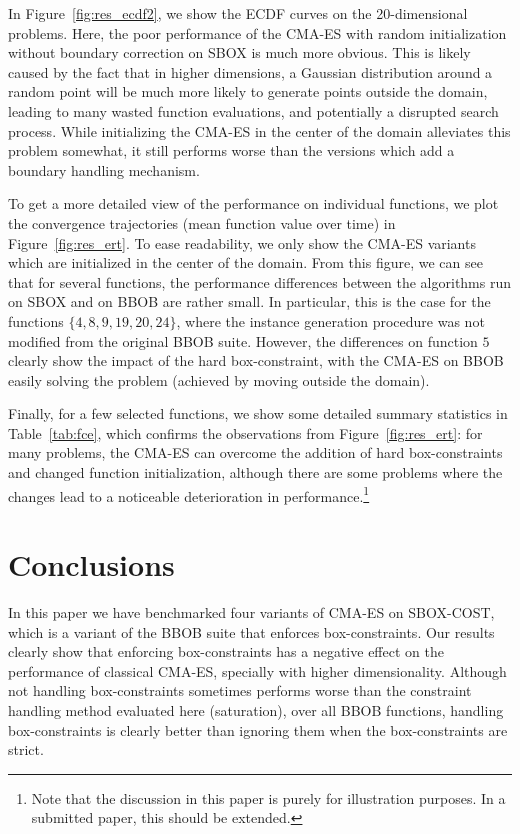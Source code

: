 \documentclass[sigconf=true, nonacm=false, review=true, anonymous = false,screen=true]{acmart}
\begin{document}
In Figure~\ref{fig:res_ecdf2}, we show the ECDF curves on the 20-dimensional problems. Here, the poor performance of the CMA-ES with random initialization without boundary correction on SBOX is much more obvious. This is likely caused by the fact that in higher dimensions, a Gaussian distribution around a random point will be much more likely to generate points outside the domain, leading to many wasted function evaluations, and potentially a disrupted search process. While initializing the CMA-ES in the center of the domain alleviates this problem somewhat, it still performs worse than the versions which add a boundary handling mechanism. 

To get a more detailed view of the performance on individual functions, we plot the convergence trajectories (mean function value over time) in Figure~\ref{fig:res_ert}. To ease readability, we only show the CMA-ES variants which are initialized in the center of the domain. From this figure, we can see that for several functions, the performance differences between the algorithms run on SBOX and on BBOB are rather small. In particular, this is the case for the functions $\{4, 8, 9, 19, 20, 24\}$, where the instance generation procedure was not modified from the original BBOB suite. However, the differences on function $5$ clearly show the impact of the hard box-constraint, with the CMA-ES on BBOB easily solving the problem (achieved by moving outside the domain).

Finally, for a few selected functions, we show some detailed summary statistics in Table~\ref{tab:fce}, which confirms the observations from Figure~\ref{fig:res_ert}: for many problems, the CMA-ES can overcome the addition of hard box-constraints and changed function initialization, although there are some problems where the changes lead to a noticeable deterioration in performance.\footnote{Note that the discussion in this paper is purely for illustration purposes. In a submitted paper, this should be extended. }


\section{Conclusions}

In this paper we have benchmarked four variants of CMA-ES on SBOX-COST, which is a variant of the BBOB suite that enforces box-constraints. Our results clearly show that enforcing box-constraints has a negative effect on the performance of classical CMA-ES, specially with higher dimensionality. Although not handling box-constraints sometimes performs worse than the constraint handling method evaluated here (saturation), over all BBOB functions, handling box-constraints is clearly better than ignoring them when the box-constraints are strict.
\end{document}
